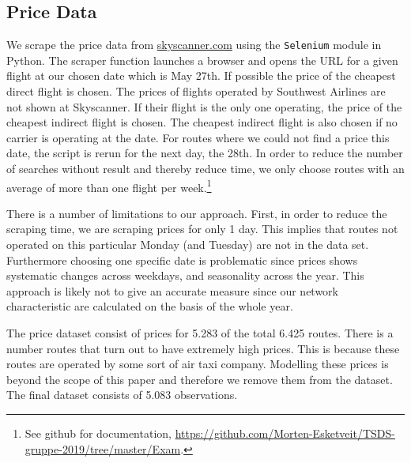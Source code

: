 \subsection{Price Data}
We scrape the price data from \url{skyscanner.com} using the \texttt{Selenium} module in Python. The scraper function launches a browser and opens the URL for a given flight at our chosen date which is May 27th. If possible the price of the cheapest direct flight is chosen. The prices of flights operated by Southwest Airlines are not shown at Skyscanner. If their flight is the only one operating, the price of the cheapest indirect flight is chosen. The cheapest indirect flight is also chosen if no carrier is operating at the date. For routes where we could not find a price this date, the script is rerun for the next day, the 28th. In order to reduce the number of searches without result and thereby reduce time, we only choose routes with an average of more than one flight per week.\footnote{See github for documentation, \url{https://github.com/Morten-Esketveit/TSDS-gruppe-2019/tree/master/Exam}.}

There is a number of limitations to our approach. First, in order to reduce the scraping time, we are scraping prices for only 1 day. This implies that routes not operated on this particular Monday (and Tuesday) are not in the data set. Furthermore choosing one specific date is problematic since prices shows systematic changes across weekdays, and seasonality across the year. This approach is likely not to give an accurate measure since our network characteristic are calculated on the basis of the whole year. 

The price dataset consist of prices for 5.283 of the total 6.425 routes. There is a number routes that turn out to have extremely high prices. This is because these routes are operated by some sort of air taxi company. Modelling these prices is beyond the scope of this paper and therefore we remove them from the dataset. The final dataset consists of 5.083 observations.




